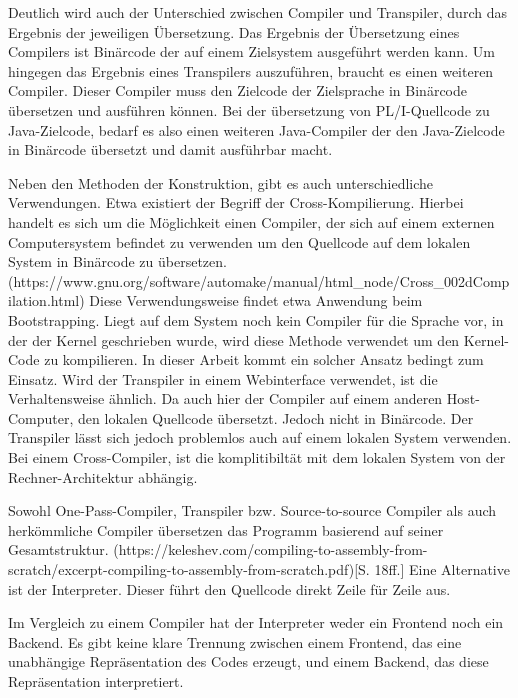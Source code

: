 Deutlich wird auch der Unterschied zwischen Compiler und Transpiler, durch das Ergebnis der jeweiligen Übersetzung. 
Das Ergebnis der Übersetzung eines Compilers ist Binärcode der auf einem Zielsystem ausgeführt werden kann. Um hingegen das Ergebnis eines Transpilers auszuführen,
braucht es einen weiteren Compiler. Dieser Compiler muss den Zielcode der Zielsprache in Binärcode übersetzen und ausführen können.
Bei der übersetzung von PL/I-Quellcode zu Java-Zielcode, bedarf es also einen weiteren Java-Compiler der den Java-Zielcode in Binärcode übersetzt 
und damit ausführbar macht.  

Neben den Methoden der Konstruktion, gibt es auch unterschiedliche Verwendungen. 
Etwa existiert der Begriff der Cross-Kompilierung. Hierbei handelt es sich um die Möglichkeit einen Compiler, der sich auf einem externen Computersystem befindet zu verwenden um den Quellcode auf dem lokalen System in Binärcode zu übersetzen. (https://www.gnu.org/software/automake/manual/html_node/Cross_002dCompilation.html) 
Diese Verwendungsweise findet etwa Anwendung beim Bootstrapping. Liegt auf dem System noch kein Compiler für die Sprache vor, in der der Kernel geschrieben wurde, wird diese Methode verwendet um den Kernel-Code zu kompilieren. 
In dieser Arbeit kommt ein solcher Ansatz bedingt zum Einsatz. Wird der Transpiler in einem Webinterface verwendet, ist die Verhaltensweise ähnlich.
Da auch hier der Compiler auf einem anderen Host-Computer, den lokalen Quellcode übersetzt. Jedoch nicht in Binärcode. 
Der Transpiler lässt sich jedoch problemlos auch auf einem lokalen System verwenden. Bei einem Cross-Compiler, ist die komplitibiltät mit dem lokalen System von der Rechner-Architektur abhängig.

Sowohl One-Pass-Compiler, Transpiler bzw. Source-to-source Compiler als auch herkömmliche Compiler übersetzen das Programm basierend auf seiner Gesamtstruktur. (https://keleshev.com/compiling-to-assembly-from-scratch/excerpt-compiling-to-assembly-from-scratch.pdf)[S. 18ff.] 
Eine Alternative ist der Interpreter. Dieser führt den Quellcode direkt Zeile für Zeile aus.

Im Vergleich zu einem Compiler hat der Interpreter weder ein Frontend noch ein Backend. Es gibt keine klare Trennung zwischen einem Frontend, das eine unabhängige Repräsentation des Codes erzeugt, und einem Backend, das diese Repräsentation interpretiert. 

